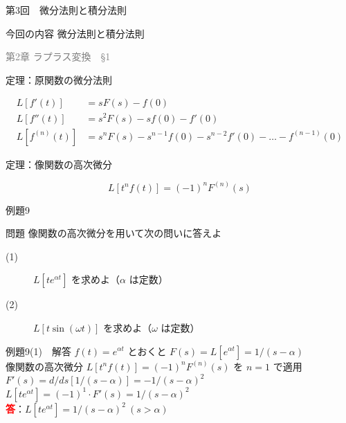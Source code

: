 \documentclass[professionalfonts]{beamer}
\begin{document}
\begin{frame}{第3回　微分法則と積分法則}
  \begin{block}{今回の内容}
  微分法則と積分法則
  \end{block}
  \vfill\hfill{\scriptsize \textcolor{gray}{第2章 ラプラス変換　§1}}
\end{frame}

\begin{frame}{定理：原関数の微分法則}
  \begin{block}{}
  \begin{align*}
    L[f'(t)]    &= sF(s) - f(0) \\
    L[f''(t)]   &= s^{2}F(s) - sf(0) - f'(0) \\
    L[f^{(n)}(t)] &= s^n F(s) - s^{n-1}f(0) - s^{n-2}f'(0) - \ldots - f^{(n-1)}(0)
  \end{align*}
  \end{block}
\end{frame}

\begin{frame}{定理：像関数の高次微分}
  \begin{block}{}
  \[
    L[t^n f(t)] = (-1)^n F^{(n)}(s)
  \]
  \end{block}
\end{frame}

\begin{frame}{例題9}
  \begin{exampleblock}{問題}
    像関数の高次微分を用いて次の問いに答えよ\\[2pt]
    \begin{description}
      \item[(1)] $L[te^{\alpha t}]$ を求めよ（$\alpha$ は定数）
      \item[(2)] $L[t\sin(\omega t)]$ を求めよ（$\omega$ は定数）
    \end{description}
  \end{exampleblock}
\end{frame}

\begin{frame}{例題9(1)　解答}
  $f(t) = e^{\alpha t}$ とおくと $F(s) = L[e^{\alpha t}] = 1/(s-\alpha)$\\[4pt]
  像関数の高次微分 $L[t^n f(t)] = (-1)^n F^{(n)}(s)$ を $n=1$ で適用\\[4pt]
  $F'(s) = d/ds[1/(s-\alpha)] = -1/(s-\alpha)^{2}$\\[4pt]
  $L[te^{\alpha t}] = (-1)^{1}\cdot F'(s) = 1/(s-\alpha)^{2}$
  \\[8pt]\textcolor{red}{\textbf{答}}：$L[te^{\alpha t}] = 1/(s-\alpha)^{2} \ (s > \alpha)$
\end{frame}
\end{document}
